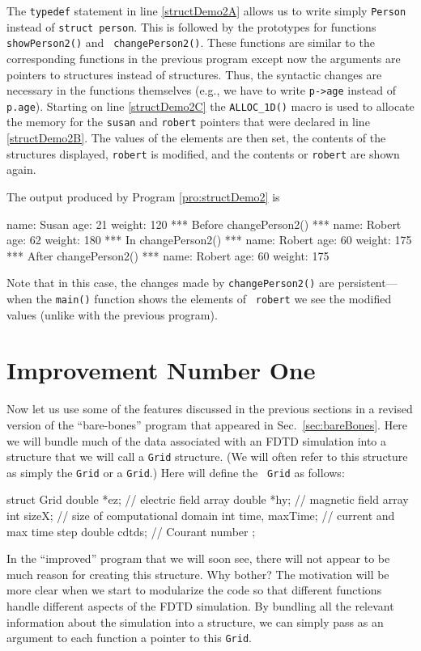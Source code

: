 The {\tt typedef} statement in line \ref{structDemo2A} allows us to
write simply {\tt Person} instead of {\tt struct person}.  This is
followed by the prototypes for functions {\tt showPerson2()} and {\tt
  changePerson2()}.  These functions are similar to the corresponding
functions in the previous program except now the arguments are
pointers to structures instead of structures.  Thus, the syntactic
changes are necessary in the functions themselves (e.g., we have to
write \verb+p->age+ instead of \verb+p.age+).  Starting on line
\ref{structDemo2C} the {\tt ALLOC\_1D()} macro is used to allocate the
memory for the {\tt susan} and {\tt robert} pointers that were
declared in line \ref{structDemo2B}.  The values of the elements are
then set, the contents of the structures displayed, {\tt robert} is
modified, and the contents or {\tt robert} are shown again.

The output produced by 
Program \ref{pro:structDemo2} is
\begin{code}
name: Susan
age: 21
weight: 120
*** Before changePerson2() ***
name: Robert
age: 62
weight: 180
*** In changePerson2() ***
name: Robert
age: 60
weight: 175
*** After changePerson2() ***
name: Robert
age: 60
weight: 175
\end{code}
Note that in this case, the changes made by {\tt changePerson2()} are
persistent---when the {\tt main()} function shows the elements of {\tt
  robert} we see the modified values (unlike with the previous
program).




\section{Improvement Number One \label{sec:improveOne}}

Now let us use some of the features discussed in the previous sections
in a revised version of the ``bare-bones'' program that appeared in
Sec.\ \ref{sec:bareBones}.  Here we will bundle much of the data
associated with an FDTD simulation into a structure that we will call
a {\tt Grid} structure.  (We will often refer to this structure as
simply the {\tt Grid} or a {\tt Grid}.)  Here will define the {\tt
  Grid} as follows:
\begin{code}
  struct Grid {
    double *ez;        // electric field array
    double *hy;        // magnetic field array
    int sizeX;         // size of computational domain
    int time, maxTime; // current and max time step
    double cdtds;      // Courant number
  };
\end{code}
In the ``improved'' program that we will soon see, there will not
appear to be much reason for creating this structure.  Why bother?
The motivation will be more clear when we start to modularize the code
so that different functions handle different aspects of the FDTD
simulation.  By bundling all the relevant information about the
simulation into a structure, we can simply pass as an argument to each
function a pointer to this {\tt Grid}.

